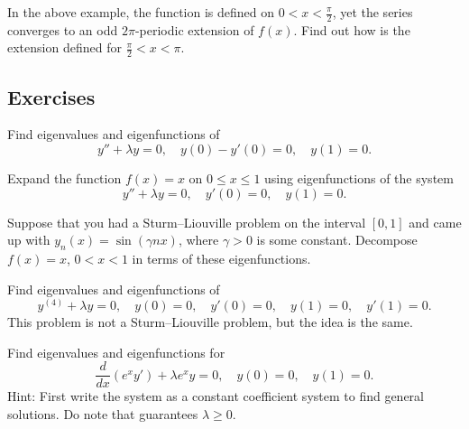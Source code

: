 \begin{exercise}[challenging]
In the above example, the function is defined on $0 < x < \frac{\pi}{2}$,
yet the series converges to an odd $2\pi$-periodic extension of $f(x)$.
Find out how is the extension defined for $\frac{\pi}{2} < x < \pi$.
\end{exercise}

\subsection{Exercises}

\begin{exercise}
Find eigenvalues and eigenfunctions of
\begin{equation*}
y''+\lambda y = 0, \quad y(0)- y'(0) = 0, \quad y(1) = 0 .
\end{equation*}
\end{exercise}

\begin{exercise}
Expand the function $f(x) = x$ on $0 \leq x \leq 1$ using eigenfunctions
of the system
\begin{equation*}
y'' + \lambda y = 0, \quad y'(0) = 0, \quad y(1) = 0 .
\end{equation*}
\end{exercise}

\begin{exercise}
Suppose that you had a Sturm--Liouville problem on the interval
$[0,1]$ and came up with
$y_n(x) = \sin (\gamma n x)$, where $\gamma > 0$ is some constant.
Decompose $f(x) = x$, $0 < x < 1$ in terms of these eigenfunctions.
\end{exercise}

\begin{exercise}
Find eigenvalues and eigenfunctions of
\begin{equation*}
y^{(4)}+\lambda y = 0, \quad y(0) = 0, \quad y'(0) = 0, \quad y(1) = 0, \quad
y'(1) = 0 .
\end{equation*}
This problem is not a Sturm--Liouville problem, but the idea is the same.
\end{exercise}

\begin{exercise}
Find eigenvalues and eigenfunctions for
\begin{equation*}
\frac{d}{dx} (e^x y') + \lambda e^x y = 0, \quad y(0) = 0, \quad y(1) = 0 .
\end{equation*}
Hint: First write the system as a constant coefficient system to find
general solutions.  Do note that  guarantees $\lambda \geq 0$.
\end{exercise}

